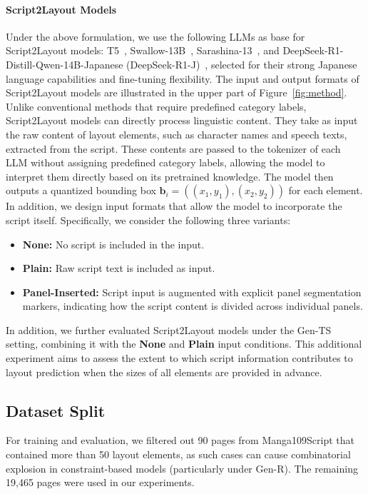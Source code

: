 \vspace{-1.0em}
\paragraph{Script2Layout Models}
Under the above formulation, we use the following LLMs as base for Script2Layout models: T5~\cite{raffel2020exploring_t5, sonoisa_t5_base_japanese}, Swallow-13B~\cite{swallow13b}, Sarashina-13~\cite{sarashina13b}, and DeepSeek-R1-Distill-Qwen-14B-Japanese (DeepSeek-R1-J)~\cite{deepseek-ai_deepseek-r1_2025}, selected for their strong Japanese language capabilities and fine-tuning flexibility. The input and output formats of Script2Layout models are illustrated in the upper part of Figure~\ref{fig:method}. Unlike conventional methods that require predefined category labels, Script2Layout models can directly process linguistic content. They take as input the raw content of layout elements, such as character names and speech texts, extracted from the script. These contents are passed to the tokenizer of each LLM without assigning predefined category labels, allowing the model to interpret them directly based on its pretrained knowledge. The model then outputs a quantized bounding box $\mathbf{b}_i = ((x_1, y_1), (x_2, y_2))$ for each element. In addition, we design input formats that allow the model to incorporate the script itself. Specifically, we consider the following three variants:
\begin{itemize}
  \item \textbf{None:} No script is included in the input.
  \item \textbf{Plain:} Raw script text is included as input.
  \item \textbf{Panel-Inserted:} Script input is augmented with explicit panel segmentation markers, indicating how the script content is divided across individual panels.
\end{itemize}
In addition, we further evaluated Script2Layout models under the Gen-TS setting, combining it with the \textbf{None} and \textbf{Plain} input conditions. This additional experiment aims to assess the extent to which script information contributes to layout prediction when the sizes of all elements are provided in advance.

\subsection{Dataset Split}
For training and evaluation, we filtered out 90 pages from Manga109Script that contained more than 50 layout elements, as such cases can cause combinatorial explosion in constraint-based models (particularly under Gen-R). The remaining 19,465 pages were used in our experiments.

